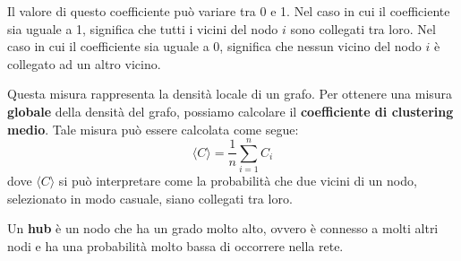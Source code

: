 Il valore di questo coefficiente può variare tra 0 e 1. Nel caso in cui il
coefficiente sia uguale a 1, significa che tutti i vicini del nodo $i$ sono
collegati tra loro. Nel caso in cui il coefficiente sia uguale a 0, significa
che nessun vicino del nodo $i$ è collegato ad un altro vicino.

Questa misura rappresenta la densità locale di un grafo. Per ottenere una
misura \textbf{globale} della densità del grafo, possiamo calcolare il
\textbf{coefficiente di clustering medio}. Tale misura può essere calcolata come
segue:
\begin{equation}
    \langle C \rangle = \frac{1}{n} \sum_{i=1}^{n} C_i
\end{equation}
dove $\langle C \rangle$ si può interpretare come la probabilità che due vicini
di un nodo, selezionato in modo casuale, siano collegati tra loro.
\begin{definizione}
    Un \textbf{hub} è un nodo che ha un grado molto alto, ovvero è connesso a
    molti altri nodi e ha una probabilità molto bassa di occorrere nella rete.
\end{definizione}
